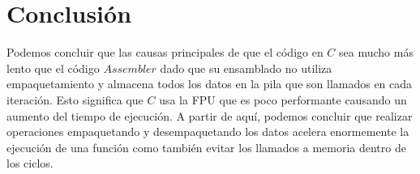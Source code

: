 \documentclass[10pt, a4paper]{article}
\begin{document}
\section{Conclusi\'on}
Podemos concluir que las causas principales de que el código en $C$ sea mucho más lento que el código $Assembler$ dado que su ensamblado no utiliza empaquetamiento y almacena todos los datos en la pila que son llamados en cada iteración. Esto significa que $C$ usa la FPU que es poco performante causando un aumento del tiempo de ejecución.\newline
A partir de aquí, podemos concluir que realizar operaciones empaquetando y desempaquetando los datos acelera enormemente la ejecución de una función como también evitar los llamados a memoria dentro de los ciclos.
\end{document}
